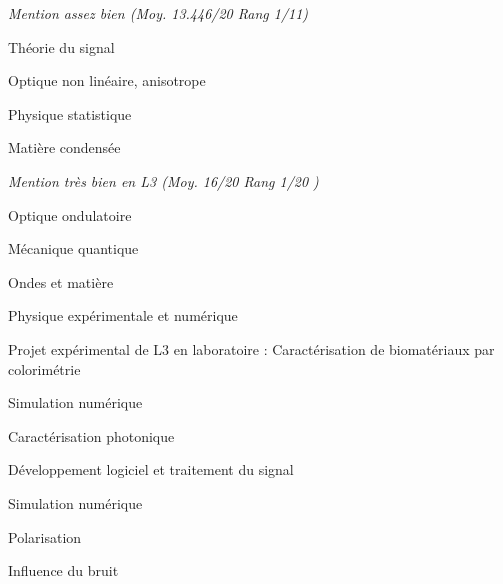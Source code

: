 \documentclass[9pt,a4paper,academicons]{altacv}
\begin{document}
\divider

\textit{Mention assez bien (Moy. 13.446/20 Rang 1/11)}
\begin{cvlistdescription}
    \item Théorie du signal
    \item Optique non linéaire, anisotrope
    \item Physique statistique
    \item Matière condensée
\end{cvlistdescription}
\divider

\textit{Mention très bien en L3 (Moy. 16/20 Rang 1/20 )}
\begin{cvlistdescription}
    \item Optique ondulatoire
    \item Mécanique quantique
    \item Ondes et matière
    \item Physique expérimentale et numérique
    \item Projet expérimental de L3 en laboratoire : Caractérisation de biomatériaux par colorimétrie
\end{cvlistdescription}




\begin{cvlistdescription}
    \item Simulation numérique
    \item Caractérisation photonique
    \item Développement logiciel et traitement du signal
\end{cvlistdescription}

\divider


\begin{cvlistdescription}
    \item Simulation numérique
    \item Polarisation
    \item Influence du bruit
\end{cvlistdescription}
\end{document}
